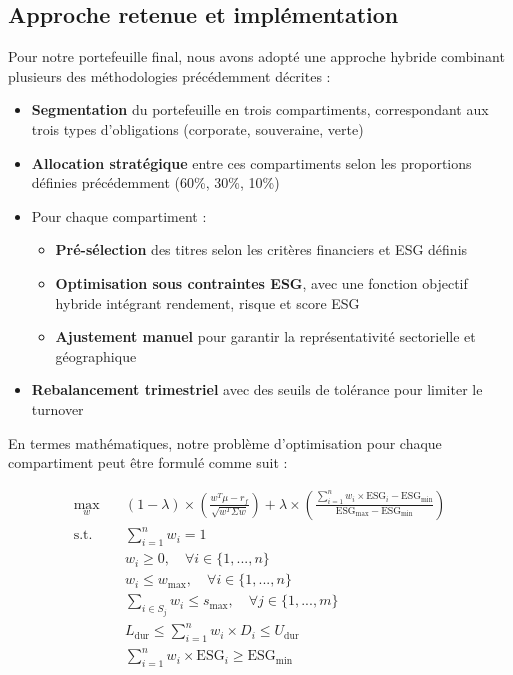 \subsection{Approche retenue et implémentation}

Pour notre portefeuille final, nous avons adopté une approche hybride combinant plusieurs des méthodologies précédemment décrites :

\begin{itemize}
    \item \textbf{Segmentation} du portefeuille en trois compartiments, correspondant aux trois types d'obligations (corporate, souveraine, verte)
    
    \item \textbf{Allocation stratégique} entre ces compartiments selon les proportions définies précédemment (60\%, 30\%, 10\%)
    
    \item Pour chaque compartiment :
    \begin{itemize}
        \item \textbf{Pré-sélection} des titres selon les critères financiers et ESG définis
        \item \textbf{Optimisation sous contraintes ESG}, avec une fonction objectif hybride intégrant rendement, risque et score ESG
        \item \textbf{Ajustement manuel} pour garantir la représentativité sectorielle et géographique
    \end{itemize}
    
    \item \textbf{Rebalancement trimestriel} avec des seuils de tolérance pour limiter le turnover
\end{itemize}

En termes mathématiques, notre problème d'optimisation pour chaque compartiment peut être formulé comme suit :

\begin{align}
\max_w \quad & (1-\lambda) \times \left( \frac{w^T \mu - r_f}{\sqrt{w^T \Sigma w}} \right) + \lambda \times \left( \frac{\sum_{i=1}^n w_i \times \text{ESG}_i - \text{ESG}_{\text{min}}}{\text{ESG}_{\text{max}} - \text{ESG}_{\text{min}}} \right) \\
\text{s.t.} \quad & \sum_{i=1}^n w_i = 1 \\
& w_i \geq 0, \quad \forall i \in \{1,...,n\} \\
& w_i \leq w_{\text{max}}, \quad \forall i \in \{1,...,n\} \\
& \sum_{i \in S_j} w_i \leq s_{\text{max}}, \quad \forall j \in \{1,...,m\} \\
& L_{\text{dur}} \leq \sum_{i=1}^n w_i \times D_i \leq U_{\text{dur}} \\
& \sum_{i=1}^n w_i \times \text{ESG}_i \geq \text{ESG}_{\text{min}}
\end{align}

